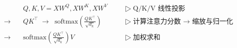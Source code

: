 \begin{align*}
            & Q, K, V = XW^Q, XW^K, XW^V  && \quad \scriptstyle ▷\; \text{Q/K/V 线性投影} \\
    → \quad & QK^\top \;→\;\; \text{softmax}(\frac{QK^\top}{\sqrt{d_k}}) && \quad \scriptstyle ▷\; \text{计算注意力分数 → 缩放与归一化} \\
    → \quad & \text{softmax}(\frac{QK^\top}{\sqrt{d_k}})V && \quad \scriptstyle ▷\; \text{加权求和}
\end{align*}